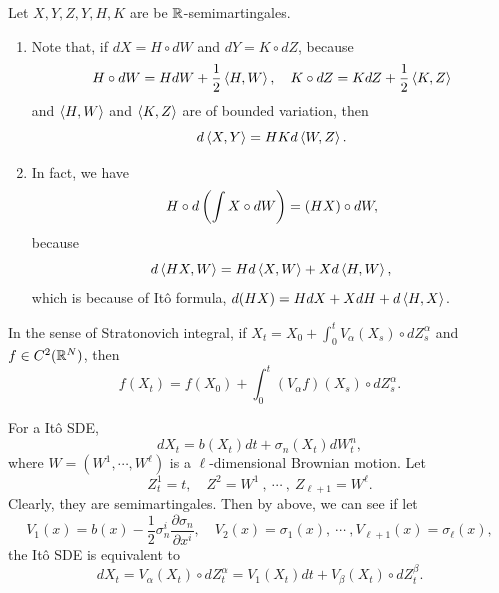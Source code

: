 \begin{rmk}
    Let $X,Y,Z,Y,H,K$ are be $\mathbb{R}$-semimartingales.
    \begin{enumerate}[label=(\arabic{*})]
        \item Note that, if $dX = H \circ dW$ and $dY = K \circ dZ$, because
        \begin{equation*}
            H \circ dW = HdW + \frac{1}{2}\left\langle H,W \right\rangle,\quad K \circ dZ = KdZ + \frac{1}{2} \left\langle K,Z \right\rangle
        \end{equation*}
        and $\left\langle H,W \right\rangle$ and $\left\langle K,Z \right\rangle$ are of bounded variation, then
        \begin{equation*}
            d\left\langle X,Y \right\rangle = HK d \left\langle W,Z \right\rangle.
        \end{equation*}

        \item In fact, we have
        \begin{equation*}
            H \circ d \left(\int X \circ dW\right) = (HX) \circ dW,
        \end{equation*}
        because
        \begin{equation*}
            d\left\langle HX,W \right\rangle = Hd\left\langle X,W \right\rangle + Xd\left\langle H,W \right\rangle,
        \end{equation*}
        which is because of It\^o formula, $d(HX) = HdX +XdH + d\left\langle H,X \right\rangle$.
    \end{enumerate}
\end{rmk}

In the sense of Stratonovich integral, if $X_t=X_0+\int_0^t V_\alpha\left(X_s\right) \circ d Z^\alpha_s$ and $f \in C^2(\mathbb{R}^N)$, then
\begin{equation*}
	f(X_t) = f(X_0) + \int_0^t (V_\alpha f)(X_s) \circ dZ^\alpha_s.
\end{equation*}

For a It\^o SDE,
\begin{equation*}
    dX_t = b(X_t)dt + \sigma_n(X_t)dW_t^n,
\end{equation*}
where $W = (W^1,\cdots,W^\ell)$ is a $\ell$-dimensional Brownian motion. Let
\begin{equation*}
    Z^1_t = t,\quad Z^2 = W^1~,~\cdots~,~Z_{\ell+1} = W^\ell.
\end{equation*}
Clearly, they are semimartingales. Then by above, we can see if let
\begin{equation*}
    V_1(x) = b(x) - \frac{1}{2}\sigma_n^i \frac{\partial \sigma_n}{\partial x^i},\quad V_2(x) = \sigma_1(x),~\cdots~,V_{\ell+1}(x) = \sigma_\ell(x),
\end{equation*}
the It\^o SDE is equivalent to
\begin{equation*}
    dX_t = V_\alpha(X_t) \circ dZ^\alpha_t = V_1(X_t)dt + V_\beta(X_t) \circ dZ^\beta_t.
\end{equation*}

